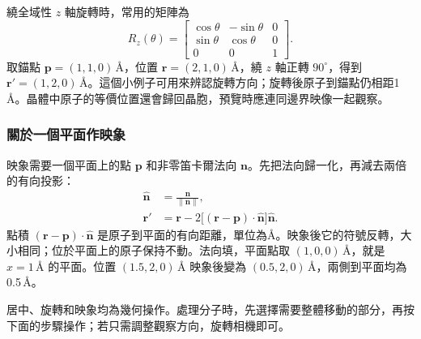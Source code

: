 繞全域性 $z$ 軸旋轉時，常用的矩陣為
\[
 R_z(\theta)=\begin{bmatrix}
 \cos\theta&-\sin\theta&0\\
 \sin\theta&\cos\theta&0\\
 0&0&1
 \end{bmatrix}.
\]
取錨點 $\mathbf p=(1,1,0)\,\text{\AA}$，位置 $\mathbf r=(2,1,0)\,\text{\AA}$，繞 $z$ 軸正轉 $90^\circ$，得到 $\mathbf r'=(1,2,0)\,\text{\AA}$。這個小例子可用來辨認旋轉方向；旋轉後原子到錨點仍相距1\,\AA。晶體中原子的等價位置還會歸回晶胞，預覽時應連同邊界映像一起觀察。

\subsubsection{關於一個平面作映象}

映象需要一個平面上的點 $\mathbf p$ 和非零笛卡爾法向 $\mathbf n$。先把法向歸一化，再減去兩倍的有向投影：
\begin{equation}
 \begin{aligned}
 \hat{\mathbf n}&=\frac{\mathbf n}{\|\mathbf n\|},\\
 \mathbf r'&=\mathbf r-
 2\bigl[(\mathbf r-\mathbf p)\cdot\hat{\mathbf n}\bigr]
       \hat{\mathbf n}.
 \end{aligned}
 \label{eq:mirror-cartesian-plane}
\end{equation}
點積 $(\mathbf r-\mathbf p)\cdot\hat{\mathbf n}$ 是原子到平面的有向距離，單位為\AA。映象後它的符號反轉，大小相同；位於平面上的原子保持不動。法向填，平面點取 $(1,0,0)\,\text{\AA}$，就是 $x=1\,\text{\AA}$ 的平面。位置 $(1.5,2,0)\,\text{\AA}$ 映象後變為 $(0.5,2,0)\,\text{\AA}$，兩側到平面均為0.5\,\AA。



居中、旋轉和映象均為幾何操作。處理分子時，先選擇需要整體移動的部分，再按下面的步驟操作；若只需調整觀察方向，旋轉相機即可。
